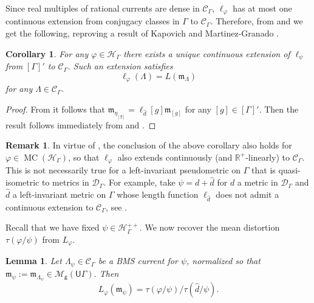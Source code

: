 \documentclass[twoside]{amsart}
\newtheorem{corollary}[theorem]{Corollary}
\newtheorem{lemma}[theorem]{Lemma}
\theoremstyle{definition}
\newtheorem{remark}[theorem]{Remark}
\numberwithin{equation}{section}
\numberwithin{theorem}{section}
\newcommand{\msf}[1]{\mathsf{#1}}
\newcommand{\R}{\mathbb{R}}
\newcommand{\calC}{\mathcal{C}}
\newcommand{\calD}{\mathcal{D}}
\newcommand{\calH}{\mathcal{H}}
\newcommand{\calM}{\mathcal{M}}
\newcommand{\frakm}{\mathfrak{m}}
\newcommand{\G}{\Gamma}
\newcommand{\Lam}{\Lambda}
\newcommand{\p}{\psi}
\newcommand{\UG}{\msf{U}\G}
\DeclareMathOperator{\MC}{MC}
\begin{document}
Since real multiples of rational currents are dense in $\calC_\G$, $\ell_{\varphi}$ has at most one continuous extension from conjugacy classes in $\G$ to $\calC_\G$. Therefore, from  and  we get the following, reproving a result of Kapovich and Martinez-Granado \cite{kapovich-martinezgranado}.

\begin{corollary}\label{coro.ellL}
For any $\varphi\in \calH_\G$ there exists a unique continuous extension of $\ell_\p$ from $[\G]'$ to $\calC_\G$. Such an extension satisfies
    \[\ell_{\varphi}(\Lam)=L(\frakm_\Lam)\]
for any $\Lam \in \calC_\G$.
\end{corollary}

\begin{proof}
    From  it follows that $\frakm_{\eta_{[g]}}=\ell_{\hat d}[g]\frakm_{[g]}$ for any $[g]\in [\G]'$. Then the result follows immediately from  and . 
\end{proof}

\begin{remark}\label{rmk:extensioninMC} In virtue of , the conclusion of the above corollary also holds for $\varphi \in \MC(\calH_\G)$, so that $\ell_\varphi$ also extends continuously (and $\R^+$-linearly) to $\calC_\G$. This is not necessarily true for a left-invariant pseudometric on $\G$ that is quasi-isometric to metrics in $\calD_\G$. For example, take $\p=d+\hat d$ for $d$ a metric in $\calD_\G$ and $\hat d$ a left-invariant metric on $\G$ whose length function $\ell_{\hat d}$ does not admit a continuous extension to $\calC_\G$, see \cite[Proposition~11]{bonahon.currentshpygroups}.
\end{remark}

Recall that we have fixed $\p\in \calH_\G^{++}$. We now recover the mean distortion $\tau(\varphi/\p)$ from $L_{\varphi}$.

\begin{lemma}\label{lem.tauLBM}
      Let $\Lam_{\p}\in \calC_\G$ be a BMS current for $\p$, normalized so that $\frakm_{\p}:=\frakm_{\Lam_{\p}} \in \calM_{\msf{g}}(\UG)$. Then 
    \begin{equation}\label{eq:lemtau}
        L_{\varphi}(\frakm_\p)=\tau(\varphi/\p)/\tau(\hat d/\p).
    \end{equation}
\end{lemma}
\end{document}
